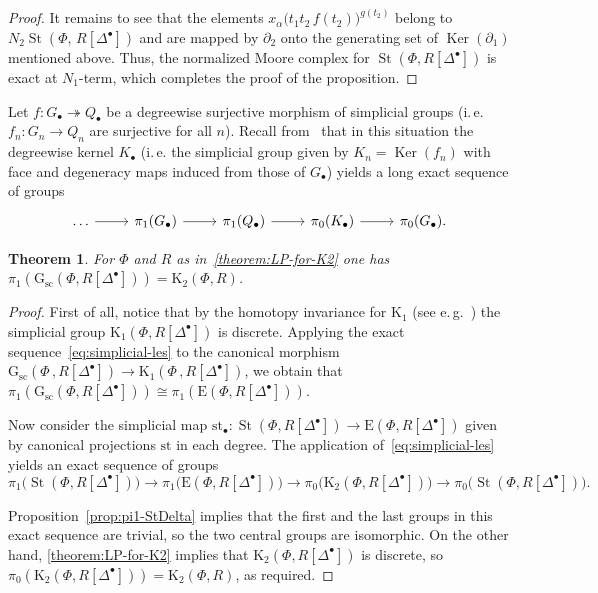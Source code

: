 \documentclass[oneside, 11pt]{amsart} \pdfoutput=1
\newcommand{\Ker}{\mathop{\mathrm{Ker}}\nolimits}
\newcommand{\K}{{\mathrm{K}}}
\newcommand{\St}{\mathop{\mathrm{St}}\nolimits}
\newcommand{\E}{\mathrm{E}}
\newcommand{\Gsc}{\mathrm{G}_\mathrm{sc}}
\numberwithin{equation}{section}
\newtheorem{theorem}[lemma]{Theorem}
\theoremstyle{definition}
\begin{document}
\begin{proof}
It remains to see that the elements $x_{\alpha}\big(t_1t_2\,f(t_2)\big)^{g(t_2)}$ belong to $N_2\St(\Phi,\,R[\Delta^\bullet])$ and are mapped by $\partial_2$ onto the generating set of $\Ker(\partial_1)$ mentioned above. Thus, the normalized Moore complex for $\St(\Phi, R[\Delta^\bullet])$ is exact at $N_1$-term, which completes the proof of the proposition. \end{proof}

Let $f\colon G_\bullet\twoheadrightarrow Q_\bullet$ be a degreewise surjective morphism of simplicial groups (i.\,e. $f_n\colon G_n\to Q_n$ are surjective for all $n$). Recall from~\cite[Theorem~1.3]{Ina75} that in this situation the degreewise kernel $K_\bullet$ (i.\,e. the simplicial group given by $K_n = \Ker(f_n)$ with face and degeneracy maps induced from those of $G_\bullet$) yields a long exact sequence of groups
\begin{equation} \label{eq:simplicial-les} \begin{tikzcd} \ldots \ar{r} & \pi_{1}(G_\bullet) \ar{r} & \pi_1(Q_\bullet) \ar{r} & \pi_0(K_\bullet) \ar{r} & \pi_0(G_\bullet). \end{tikzcd} \end{equation}

\begin{theorem} \label{theorem:pi1-GRDelta}
 For $\Phi$ and $R$ as in~\cref{theorem:LP-for-K2} one has $\pi_1(\Gsc(\Phi, R[\Delta^\bullet])) = \K_2(\Phi, R)$.
\end{theorem}
\begin{proof}
First of all, notice that by the homotopy invariance for $\K_1$ (see e.\,g.~\cite[Theorem~1.3]{Sta14}) the simplicial group $\K_1(\Phi, R[\Delta^\bullet])$ is discrete. Applying the exact sequence~\eqref{eq:simplicial-les} to the canonical morphism $\Gsc(\Phi\,,R[\Delta^\bullet]) \to \K_1(\Phi\,,R[\Delta^\bullet])$, we obtain that $\pi_1(\Gsc(\Phi, R[\Delta^\bullet])) \cong \pi_1(\E(\Phi, R[\Delta^\bullet]))$.
 
Now consider the simplicial map $\mathrm{st}_\bullet \colon \St(\Phi, R[\Delta^\bullet]) \to \E(\Phi, R[\Delta^\bullet])$ given by canonical projections $\mathrm{st}$ in each degree. The application of~\eqref{eq:simplicial-les} yields an exact sequence of groups
\[
\pi_1\bigl(\St(\Phi, R[\Delta^\bullet])\bigr) \to \pi_1\bigl(\E(\Phi, R[\Delta^\bullet])\bigr) \to \pi_0\bigl(\K_2(\Phi, R[\Delta^\bullet])\bigr) \to \pi_0\bigl(\St(\Phi, R[\Delta^\bullet])\bigr).
\]
\iffalse \[
\begin{tikzcd} \pi_1(\St(\Phi, R[\Delta^\bullet])) \ar[r] & \pi_1(\E(\Phi, R[\Delta^\bullet])) \ar[r] & \pi_0(\K_2(\Phi, R[\Delta^\bullet])) \ar[r] & \pi_0(\St(\Phi, R[\Delta^\bullet])). \end{tikzcd}
\] \fi
 Proposition~\ref{prop:pi1-StDelta} implies that the first and the last groups in this exact sequence are trivial, so the two central groups are isomorphic. On the other hand, \cref{theorem:LP-for-K2} implies that $\K_2(\Phi, R[\Delta^\bullet])$ is discrete, so $\pi_0(\K_2(\Phi, R[\Delta^\bullet])) = \K_2(\Phi, R)$, as required.
\end{proof}
\end{document}
